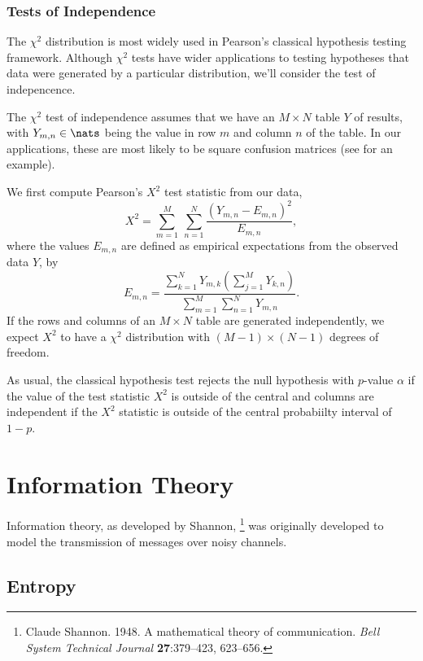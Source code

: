 \subsubsection{Tests of Independence}

The $\chi^2$ distribution is most widely used in Pearson's classical
hypothesis testing framework.  Although $\chi^2$ tests have wider
applications to testing hypotheses that data were generated by a
particular distribution, we'll consider the test of indepencence.

The $\chi^2$ test of independence assumes that we have an $M \times N$
table $Y$ of results, with $Y_{m,n} \in \nats$ being the value in row
$m$ and column $n$ of the table.  In our applications, these are most
likely to be square confusion matrices (see
 for an example).

We first compute Pearson's $X^2$ test statistic from our data,
%
\begin{equation}
X^2 = \sum_{m=1}^M \ \sum_{n=1}^N \frac{(Y_{m,n} - E_{m,n})^2}{E_{m,n}},
\end{equation}
%
where the values $E_{m,n}$ are defined as empirical expectations
from the observed data $Y$, by
%
\begin{equation}
E_{m,n} = \frac{\sum_{k=1}^N Y_{m,k} \left( \sum_{j=1}^M Y_{k,n}\right) } 
              {\sum_{m=1}^M \sum_{n=1}^N Y_{m,n}}.
\end{equation}
%
If the rows and columns of an $M \times N$ table are generated
independently, we expect $X^2$ to have a $\chi^2$ distribution with
$(M-1) \times (N-1)$ degrees of freedom.  

As usual, the classical hypothesis test rejects the null hypothesis with
$p$-value $\alpha$ if the value of the test statistic $X^2$ is outside
of the central and columns are independent if the $X^2$ statistic is
outside of the central probabiilty interval of $1-p$.


\section{Information Theory}

Information theory, as developed by Shannon,%
%
\footnote{Claude Shannon. 1948.  A mathematical theory of communication.  {\it Bell System Technical Journal} {\bf 27}:379--423, 623--656.}
%
was originally developed to model the transmission of messages over
noisy channels.  


\subsection{Entropy}\label{section:stats-entropy}


